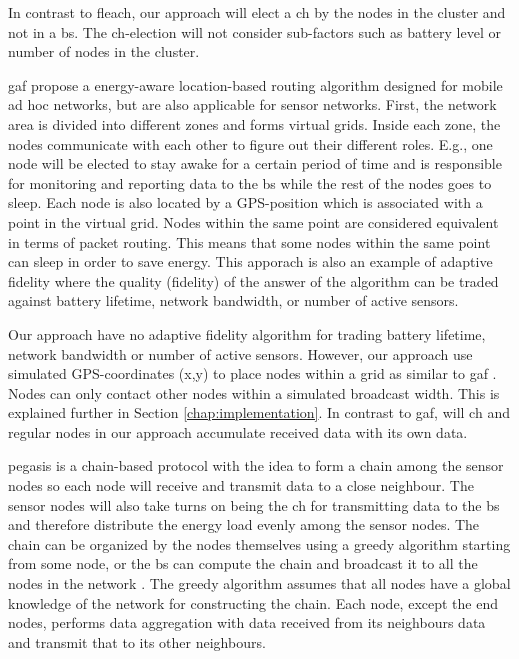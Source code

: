 \documentclass[USenglish]{uit-thesis}
\begin{document}
In contrast to \gls{fleach}, our approach will elect a \gls{ch} by the nodes in the cluster and not in a \gls{bs}. The \gls{ch}-election will not consider sub-factors such as battery level or number of nodes in the cluster.


\gls{gaf} \cite{gaf} propose a energy-aware location-based routing algorithm designed for mobile ad hoc networks, but are also applicable for sensor networks. First, the network area is divided into different zones and forms virtual grids. Inside each zone, the nodes communicate with each other to figure out their different roles. E.g., one node will be elected to stay awake for a certain period of time and is responsible for monitoring and reporting data to the \gls{bs} while the rest of the nodes goes to sleep. Each node is also located by a GPS-position which is associated with a point in the virtual grid. Nodes within the same point are considered equivalent in terms of packet routing. This means that some nodes within the same point can sleep in order to save energy. This apporach is also an example of adaptive fidelity \cite{adfidelity} where the quality (fidelity) of the answer of the algorithm can be traded against battery lifetime, network bandwidth, or number of active sensors.

Our approach have no adaptive fidelity algorithm for trading battery lifetime, network bandwidth or number of active sensors. However, our approach use simulated GPS-coordinates (x,y) to place nodes within a grid as similar to \gls{gaf} \cite{gaf}. Nodes can only contact other nodes within a simulated broadcast width. This is explained further in Section \ref{chap:implementation}. In contrast to \gls{gaf}, will \gls{ch} and regular nodes in our approach accumulate received data  with its own data.


\Gls{pegasis} is a chain-based protocol with the idea to form a chain among the sensor nodes so each node will receive and transmit data to a close neighbour. The sensor nodes will also take turns on being the \gls{ch} for transmitting data to the \gls{bs} and therefore distribute the energy load evenly among the sensor nodes. The chain can be organized by the nodes themselves using a greedy algorithm starting from some node, or the \gls{bs} can compute the chain and broadcast it to all the nodes in the network \cite{pegasis}. The greedy algorithm assumes that all nodes have a global knowledge of the network for constructing the chain. Each node, except the end nodes, performs data aggregation with data received from its neighbours data and transmit that to its other neighbours.
\end{document}
